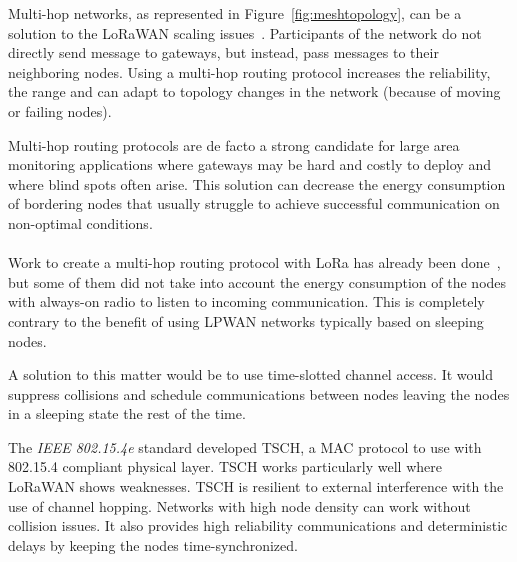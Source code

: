 


Multi-hop networks, as represented in Figure~\ref{fig:meshtopology}, can be a solution to
the LoRaWAN scaling issues~\cite{8115756}.
Participants of the network do not directly send message to gateways, but
instead, pass messages to their neighboring nodes.
Using a multi-hop routing protocol increases the reliability, the range
and can adapt to topology changes in the network (because of moving or failing nodes).

Multi-hop routing protocols are de facto a strong candidate for large area monitoring 
applications where gateways may be hard and costly to deploy and where blind
spots often arise.
This solution can decrease the energy consumption of bordering nodes that
usually struggle to achieve successful communication on non-optimal
conditions.

\paragraph{}

Work to create a multi-hop routing protocol with LoRa has already been
done~\cite{8115756, DIAS2018424, 8856256, Abrardo_2019, duong2018}, 
but some of them did not take into account the energy consumption of the nodes
with always-on radio to listen to incoming communication.
This is completely contrary to the benefit of using LPWAN networks typically
based on sleeping nodes.

A solution to this matter would be to use time-slotted channel access.
It would suppress collisions and schedule communications between nodes leaving
the nodes in a sleeping state the rest of the time.

The \emph{IEEE 802.15.4e} standard developed TSCH, a MAC
protocol to use with 802.15.4 compliant physical layer.
TSCH works particularly well where LoRaWAN shows weaknesses. 
TSCH is resilient to external interference with the use of channel hopping.
Networks with high node density can work without collision issues.
It also provides high reliability communications and deterministic delays by 
keeping the nodes time-synchronized.

